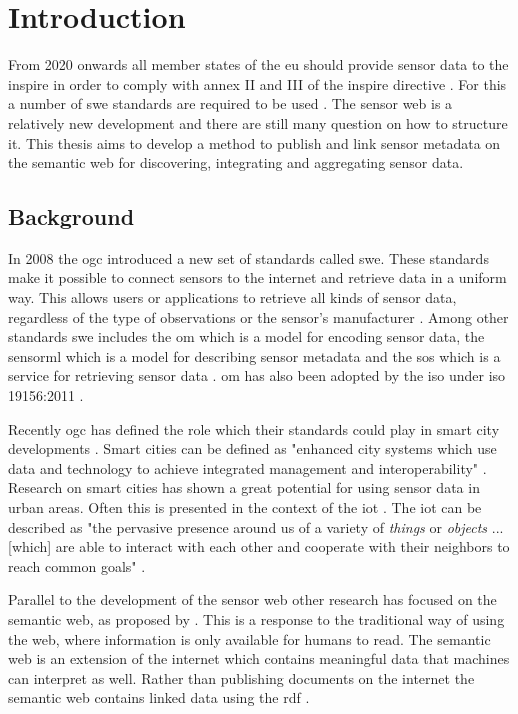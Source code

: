 
\chapter{Introduction}
\label{chap:introduction}

From 2020 onwards all member states of the \ac{eu} should provide sensor data to the \ac{inspire} in order to comply with annex II and III of the \ac{inspire} directive \citep{SDI:INSPIRE5}. For this a number of \ac{swe} standards are required to be used \citep{SDI:INSPIRE2}. The sensor web is a relatively new development and there are still many question on how to structure it. This thesis aims to develop a method to publish and link sensor metadata on the semantic web for discovering, integrating and aggregating sensor data.

\section{Background}
In 2008 the \ac{ogc} introduced a new set of standards called \ac{swe}. These standards make it possible to connect sensors to the internet and retrieve data in a uniform way. This allows users or applications to retrieve all kinds of sensor data, regardless of the type of observations or the sensor's manufacturer \citep{SW:Botts}. Among other standards \ac{swe} includes the \ac{om} which is a model for encoding sensor data, the \ac{sensorml} which is a model for describing sensor metadata and the \ac{sos} which is a service for retrieving sensor data \citep{SW:OGC}. \ac{om} has also been adopted by the \ac{iso} under \ac{iso} 19156:2011 \citep{SW:ISO}. 

Recently \ac{ogc} has defined the role which their standards could play in smart city developments \citep{SC:OGC}. Smart cities can be defined as "enhanced city systems which use data and technology to achieve integrated management and interoperability" \citep[p. 18]{SC:Moir}. Research on smart cities has shown a great potential for using sensor data in urban areas. Often this is presented in the context of the \ac{iot} \citep{IOT:Zanelli, SSW:Wang2}. The \ac{iot} can be described as "the pervasive presence around us of a variety of \textit{things} or \textit{objects} ... [which] are able to interact with each other and cooperate with their neighbors to reach common goals" \cite[p. 2787]{IOT:Atzori}. 

Parallel to the development of the sensor web other research has focused on the semantic web, as proposed by \cite{LD:Berners-lee}. This is a response to the traditional way of using the web, where information is only available for humans to read. The semantic web is an extension of the internet which contains meaningful data that machines can interpret as well. Rather than publishing documents on the internet the semantic web contains linked data using the \ac{rdf} \citep{LD:Bizer}.    

